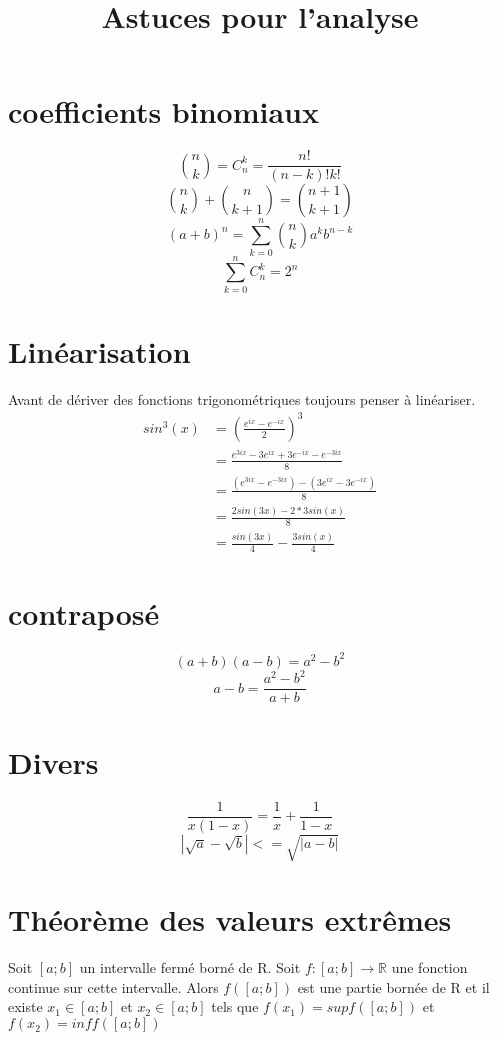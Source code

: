\documentclass[a4paper,10pt]{article}
\title{Astuces pour l'analyse}
\author{}
\begin{document}
\maketitle

\begin{abstract}

\end{abstract}
\section{coefficients binomiaux}
\[\textstyle{n \choose k} = C^{k}_{n} = \frac{n!}{(n - k)!k!}\]
\[\textstyle{n \choose k} + \textstyle{n \choose k + 1} = \textstyle{n + 1 \choose k + 1}\]
\[(a + b)^{n} = \sum_{k = 0}^{n} \textstyle{n \choose k} a^{k}b^{n - k}\]
\[\sum_{k = 0}^{n} C^{k}_{n} = 2^{n}\]

\section{Linéarisation}
Avant de dériver des fonctions trigonométriques toujours penser à linéariser.
\begin{align*}
sin^{3}(x) &= (\frac{e^{ix} - e^{-ix}}{2})^{3}\\
&= \frac{e^{3ix} - 3e^{ix} + 3e^{-ix} - e^{-3ix}}{8}\\
&= \frac{(e^{3ix} - e^{-3ix}) -(3e^{ix} - 3e^{-ix})}{8}\\
&= \frac{2sin(3x) - 2*3sin(x)}{8}\\
&= \frac{sin(3x)}{4} - \frac{3sin(x)}{4}
\end{align*}
\section{contraposé}
\[(a + b)(a - b) = a^{2} - b^{2}\]
\[a - b = \frac{a^{2} - b^{2}}{a + b}\]
\section{Divers}
\[\frac{1}{x(1 - x)} = \frac{1}{x} + \frac{1}{1 - x}\]
\[|\sqrt{a} - \sqrt{b}| <= \sqrt{|a - b|}\]
\section[Aussi nommé Théorème de Weierstrass.]{Théorème des valeurs extrêmes}



Soit $[a; b]$ un intervalle fermé borné de R. Soit $f \colon [a;b] \longrightarrow \mathbb{R}$ une fonction continue sur cette intervalle. Alors
$f([a;b])$ est une partie bornée de R et il existe $x_{1} \in [a;b]$ et $x_{2} \in [a;b]$ tels que $f(x_{1}) = sup f([a;b])$ et $f(x_{2}) = inf f([a;b])$
\end{document}
